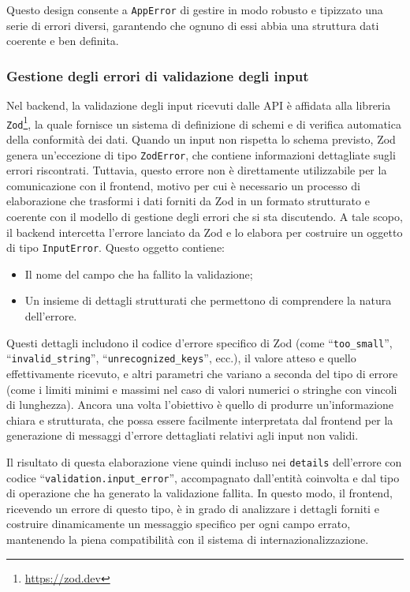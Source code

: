 Questo design consente a \texttt{AppError} di gestire in modo robusto e tipizzato una serie di errori diversi, garantendo che ognuno di essi abbia una struttura dati coerente e ben definita.

\subsubsection{Gestione degli errori di validazione degli input}\label{sec:input-validation-errors}
Nel backend, la validazione degli input ricevuti dalle API è affidata alla libreria \texttt{Zod}\footnote{\url{https://zod.dev}}, la quale fornisce un sistema di definizione di schemi e di verifica automatica della conformità dei dati. Quando un input non rispetta lo schema previsto, Zod genera un'eccezione di tipo \texttt{ZodError}, che contiene informazioni dettagliate sugli errori riscontrati. Tuttavia, questo errore non è direttamente utilizzabile per la comunicazione con il frontend, motivo per cui è necessario un processo di elaborazione che trasformi i dati forniti da Zod in un formato strutturato e coerente con il modello di gestione degli errori che si sta discutendo.
%
A tale scopo, il backend intercetta l’errore lanciato da Zod e lo elabora per costruire un oggetto di tipo \texttt{InputError}. Questo oggetto contiene:
\begin{itemize}
  \item Il nome del campo che ha fallito la validazione;
  \item Un insieme di dettagli strutturati che permettono di comprendere la natura dell'errore.
\end{itemize}
Questi dettagli includono il codice d'errore specifico di Zod (come ``\texttt{too\_small}'', ``\texttt{invalid\_string}'', ``\texttt{unrecognized\_keys}'', ecc.), il valore atteso e quello effettivamente ricevuto, e altri parametri che variano a seconda del tipo di errore (come i limiti minimi e massimi nel caso di valori numerici o stringhe con vincoli di lunghezza). Ancora una volta l'obiettivo è quello di produrre un’informazione chiara e strutturata, che possa essere facilmente interpretata dal frontend per la generazione di messaggi d’errore dettagliati relativi agli input non validi.

Il risultato di questa elaborazione viene quindi incluso nei \texttt{details} dell’errore con codice ``\texttt{validation.input\_error}'', accompagnato dall’entità coinvolta e dal tipo di operazione che ha generato la validazione fallita. In questo modo, il frontend, ricevendo un errore di questo tipo, è in grado di analizzare i dettagli forniti e costruire dinamicamente un messaggio specifico per ogni campo errato, mantenendo la piena compatibilità con il sistema di internazionalizzazione.

